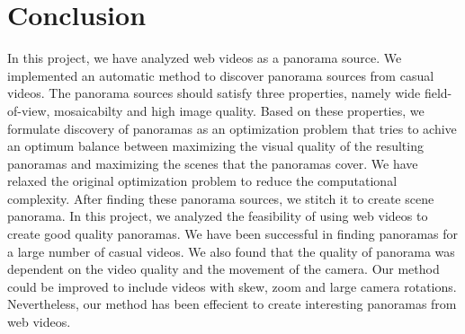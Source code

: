 \section{Conclusion}

In this project, we have analyzed web videos as a panorama source. We implemented an automatic method to discover panorama sources from casual videos. 
The panorama sources should satisfy three properties, namely wide field-of-view, mosaicabilty and high image quality. Based on these properties, we formulate discovery of panoramas as an 
optimization problem that tries to achive an optimum balance between maximizing the visual quality of the resulting panoramas and maximizing the scenes that the panoramas cover. We have relaxed the original 
optimization problem to reduce the computational complexity. After finding these panorama sources, we stitch it to create scene panorama. 
In this project, we analyzed the feasibility of using web videos to create good quality panoramas. We have been successful in finding panoramas for a large number of casual videos.  We also found that the quality of panorama was dependent on the video quality
and the movement of the camera. Our method could be improved to include videos with skew, zoom and large camera rotations. Nevertheless, our method has been effecient to create interesting panoramas from web videos.